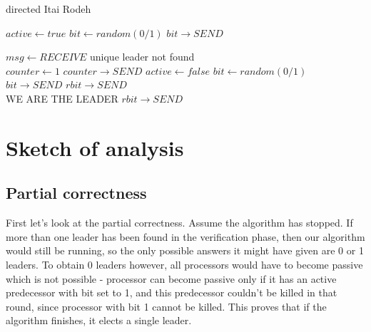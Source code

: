 \documentclass{article}
\begin{document}
\begin{algorithm}[H]
  \caption{directed Itai Rodeh} \label{directed}
  \begin{algorithmic}[1]
    \State $active \leftarrow true$
    \State $bit \leftarrow random(0/1)$ \label{gotomarker} 
    \State $bit \rightarrow SEND$
    
    \Repeat
        \State $msg \leftarrow RECEIVE$
            \State {} 
        \Else
            \State {} 
        \EndIf
    \Until unique leader not found
    \\
                \State $counter \leftarrow 1$
                \State $counter \rightarrow SEND$ 
            \EndIf
                \State $active \leftarrow false$
            \EndIf
            \State $bit \leftarrow random(0/1)$
            \State $bit \rightarrow SEND$
        \Else
            \State $rbit \rightarrow SEND$ 
        \EndIf
    \EndProcedure
    \\
                \State \Return WE ARE THE LEADER 
            \Else
                \State {} 
            \EndIf
        \Else
            \State $rbit \rightarrow SEND$ 
        \EndIf
    \EndProcedure
  \end{algorithmic}
\end{algorithm}

\section{Sketch of analysis}
\subsection{Partial correctness}
First let's look at the partial correctness. Assume the algorithm has stopped. If more than one leader has been found in the verification phase, then our algorithm would still be running, so the only possible answers it might have given are 0 or 1 leaders. To obtain 0 leaders however, all processors would have to become passive which is not possible - processor can become passive only if it has an active predecessor with bit set to 1, and this predecessor couldn't be killed in that round, since processor with bit 1 cannot be killed. This proves that if the algorithm finishes, it elects a single leader.
\end{document}
